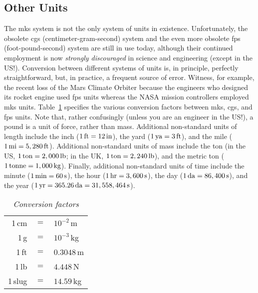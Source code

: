  \subsection{Other Units}
The mks system is not the only system of units in existence. Unfortunately, the obsolete
cgs (centimeter-gram-second) system and the even more obsolete fps (foot-pound-second) system are
still in use today, although their continued employment is now {\em strongly discouraged} in science and
engineering (except in the US!). Conversion between different systems of units is, in principle, perfectly
straightforward, but, in practice, a frequent source of error. Witness, for example,
the recent loss of the Mars Climate Orbiter because the engineers who designed its rocket
engine used fps units whereas the NASA mission controllers employed mks units. Table~\ref{t2}
specifies the various conversion factors between mks, cgs, and fps units.
Note that, rather confusingly (unless you are an engineer in the US!),
 a pound is a unit of force, rather than mass.
Additional non-standard units of length include the inch ($1\,{\rm ft} = 12\,{\rm in}$), the
yard ($1\,{\rm ya} = 3\,{\rm ft}$), and the mile ($1\,{\rm mi} = 5,280\,{\rm ft}$).
Additional non-standard units of mass include the ton (in the US, $1\,{\rm ton} = 2,000\,{\rm lb}$;
in the UK,  $1\,{\rm ton} = 2,240 \,{\rm lb}$), and the metric ton ($1\,{\rm tonne} = 1,000\,
{\rm kg}$). Finally, additional non-standard units of time include the minute ($1\,{\rm min}
= 60\,{\rm s}$), the hour ($1\,{\rm hr}
= 3,600\,{\rm s}$), the day ($1\,{\rm da} = 86,400\,{\rm s}$), and the year
($1\,{\rm yr} = 365.26\,{\rm da} = 31,558,464\,{\rm s}$). 

\begin{table}
\centering
\begin{tabular}{rcl}\hline\hline
1\,cm & $=$ & $10^{-2}$\,m\\
1\,g & $=$ & $10^{-3}$\,kg\\
1\,ft & $=$ & $0.3048$\,m\\
1\,lb & $=$ & $4.448$\,N\\
1\,slug & $=$ & $14.59$\,kg\\
\hline\hline
\end{tabular}
\caption{\em Conversion factors}\label{t2}
\end{table}

